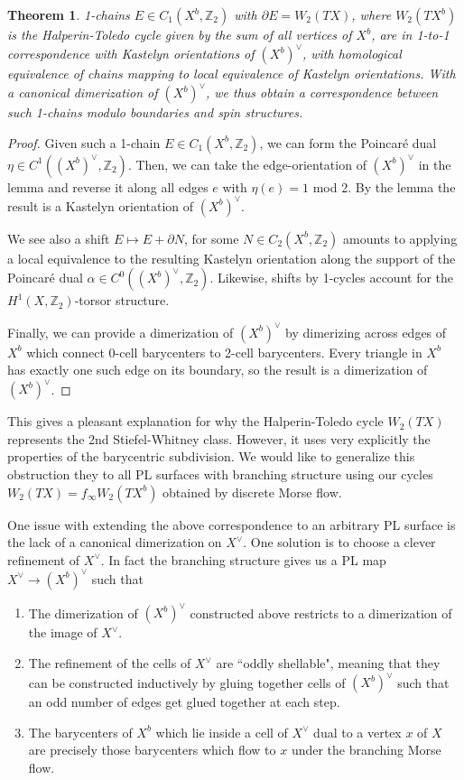\documentclass{article}
\def\bZ{\mathbb{Z}}
\newtheorem{thm}{Theorem}
\theoremstyle{definition}
\begin{document}
\begin{thm}
1-chains $E \in C_1(X^b,\bZ_2)$ with $\partial E = W_2(TX)$, where $W_2(TX^b)$ is the Halperin-Toledo cycle given by the sum of all vertices of $X^b$, are in 1-to-1 correspondence with Kastelyn orientations of $(X^b)^\vee$, with homological equivalence of chains mapping to local equivalence of Kastelyn orientations. With a canonical dimerization of $(X^b)^\vee$, we thus obtain a correspondence between such 1-chains modulo boundaries and spin structures.
\end{thm}

\begin{proof}

Given such a 1-chain $E \in C_1(X^b,\bZ_2)$, we can form the Poincar\'e dual $\eta \in C^1((X^b)^\vee,\bZ_2)$. Then, we can take the edge-orientation of $(X^b)^\vee$ in the lemma and reverse it along all edges $e$ with $\eta(e) = 1$ mod 2. By the lemma the result is a Kastelyn orientation of $(X^b)^\vee$.

We see also a shift $E \mapsto E + \partial N$, for some $N \in C_2(X^b,\bZ_2)$ amounts to applying a local equivalence to the resulting Kastelyn orientation along the support of the Poincar\'e dual $\alpha \in C^0((X^b)^\vee,\bZ_2)$. Likewise, shifts by 1-cycles account for the $H^1(X,\bZ_2)$-torsor structure.

Finally, we can provide a dimerization of $(X^b)^\vee$ by dimerizing across edges of $X^b$ which connect 0-cell barycenters to 2-cell barycenters. Every triangle in $X^b$ has exactly one such edge on its boundary, so the result is a dimerization of $(X^b)^\vee$.

\end{proof}

This gives a pleasant explanation for why the Halperin-Toledo cycle $W_2(TX)$ represents the 2nd Stiefel-Whitney class. However, it uses very explicitly the properties of the barycentric subdivision. We would like to generalize this obstruction they to all PL surfaces with branching structure using our cycles $W_2(TX) = f_\infty W_2(TX^b)$ obtained by discrete Morse flow.

One issue with extending the above correspondence to an arbitrary PL surface is the lack of a canonical dimerization on $X^\vee$. One solution is to choose a clever refinement of $X^\vee$. In fact the branching structure gives us a PL map $X^\vee \to (X^b)^\vee$ such that
\begin{enumerate}
    \item The dimerization of $(X^b)^\vee$ constructed above restricts to a dimerization of the image of $X^\vee$.
    \item The refinement of the cells of $X^\vee$ are ``oddly shellable", meaning that they can be constructed inductively by gluing together cells of $(X^b)^\vee$ such that an odd number of edges get glued together at each step.
    \item The barycenters of $X^b$ which lie inside a cell of $X^\vee$ dual to a vertex $x$ of $X$ are precisely those barycenters which flow to $x$ under the branching Morse flow.
\end{enumerate}
\end{document}
